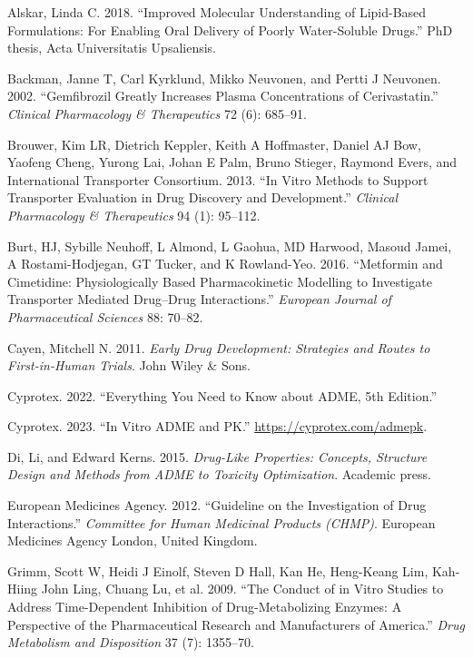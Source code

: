 \documentclass[
  11pt,
  krantz2, a4paper, twoside]{krantz}
\newlength{\cslhangindent}
\newenvironment{CSLReferences}[2] %
 {\begin{list}{}{%
  \setlength{\itemindent}{0pt}
  \setlength{\leftmargin}{0pt}
  \setlength{\parsep}{0pt}
  \ifodd #1
   \setlength{\leftmargin}{\cslhangindent}
   \setlength{\itemindent}{-1\cslhangindent}
  \fi
  \setlength{\itemsep}{#2\baselineskip}}}
 {\end{list}}
\begin{document}
\label{refs}
\begin{CSLReferences}{1}{0}
Alskar, Linda C. 2018. {``Improved Molecular Understanding of Lipid-Based Formulations: For Enabling Oral Delivery of Poorly Water-Soluble Drugs.''} PhD thesis, Acta Universitatis Upsaliensis.

Backman, Janne T, Carl Kyrklund, Mikko Neuvonen, and Pertti J Neuvonen. 2002. {``Gemfibrozil Greatly Increases Plasma Concentrations of Cerivastatin.''} \emph{Clinical Pharmacology \& Therapeutics} 72 (6): 685--91.

Brouwer, Kim LR, Dietrich Keppler, Keith A Hoffmaster, Daniel AJ Bow, Yaofeng Cheng, Yurong Lai, Johan E Palm, Bruno Stieger, Raymond Evers, and International Transporter Consortium. 2013. {``In Vitro Methods to Support Transporter Evaluation in Drug Discovery and Development.''} \emph{Clinical Pharmacology \& Therapeutics} 94 (1): 95--112.

Burt, HJ, Sybille Neuhoff, L Almond, L Gaohua, MD Harwood, Masoud Jamei, A Rostami-Hodjegan, GT Tucker, and K Rowland-Yeo. 2016. {``Metformin and Cimetidine: Physiologically Based Pharmacokinetic Modelling to Investigate Transporter Mediated Drug--Drug Interactions.''} \emph{European Journal of Pharmaceutical Sciences} 88: 70--82.

Cayen, Mitchell N. 2011. \emph{Early Drug Development: Strategies and Routes to First-in-Human Trials}. John Wiley \& Sons.

Cyprotex. 2022. {``Everything You Need to Know about ADME, 5th Edition.''}

Cyprotex. 2023. {``In Vitro ADME and PK.''} \url{https://cyprotex.com/admepk}.

Di, Li, and Edward Kerns. 2015. \emph{Drug-Like Properties: Concepts, Structure Design and Methods from ADME to Toxicity Optimization}. Academic press.

European Medicines Agency. 2012. {``Guideline on the Investigation of Drug Interactions.''} \emph{Committee for Human Medicinal Products (CHMP)}. European Medicines Agency London, United Kingdom.

Grimm, Scott W, Heidi J Einolf, Steven D Hall, Kan He, Heng-Keang Lim, Kah-Hiing John Ling, Chuang Lu, et al. 2009. {``The Conduct of in Vitro Studies to Address Time-Dependent Inhibition of Drug-Metabolizing Enzymes: A Perspective of the Pharmaceutical Research and Manufacturers of America.''} \emph{Drug Metabolism and Disposition} 37 (7): 1355--70.


\end{CSLReferences}
\end{document}
